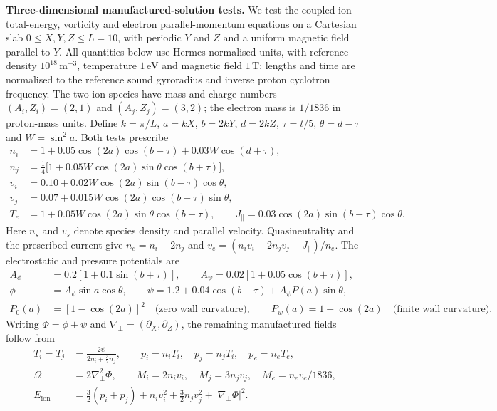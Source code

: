 \documentclass[11pt,a4paper]{article}
\begin{document}
\textbf{Three-dimensional manufactured-solution tests.}
We test the coupled ion total-energy, vorticity and electron parallel-momentum
equations on a Cartesian slab $0\leq X,Y,Z\leq L=10$, with periodic $Y$ and $Z$
and a uniform magnetic field parallel to $Y$.
All quantities below use Hermes normalised units, with reference density
$10^{18}\,\mathrm{m}^{-3}$, temperature $1\,\mathrm{eV}$ and magnetic field
$1\,\mathrm{T}$; lengths and time are normalised to the reference sound
gyroradius and inverse proton cyclotron frequency.
The two ion species have mass and charge numbers $(A_i,Z_i)=(2,1)$ and
$(A_j,Z_j)=(3,2)$; the electron mass is $1/1836$ in proton-mass units.
Define $k=\pi/L$, $a=kX$, $b=2kY$, $d=2kZ$, $\tau=t/5$,
$\theta=d-\tau$ and $W=\sin^2 a$. Both tests prescribe
\begin{align*}
 n_i &= 1+0.05\cos(2a)\cos(b-\tau)+0.03W\cos(d+\tau),\\
 n_j &= \tfrac14\bigl[1+0.05W\cos(2a)\sin\theta\cos(b+\tau)\bigr],\\
 v_i &= 0.10+0.02W\cos(2a)\sin(b-\tau)\cos\theta,\\
 v_j &= 0.07+0.015W\cos(2a)\cos(b+\tau)\sin\theta,\\
 T_e &= 1+0.05W\cos(2a)\sin\theta\cos(b-\tau),
 \qquad J_\parallel=0.03\cos(2a)\sin(b-\tau)\cos\theta.
\end{align*}
Here $n_s$ and $v_s$ denote species density and parallel velocity. Quasineutrality
and the prescribed current give $n_e=n_i+2n_j$ and
$v_e=(n_iv_i+2n_jv_j-J_\parallel)/n_e$.
The electrostatic and pressure potentials are
\begin{align*}
 A_\phi&=0.2[1+0.1\sin(b+\tau)],\qquad
 A_\psi=0.02[1+0.05\cos(b+\tau)],\\
 \phi&=A_\phi\sin a\cos\theta,\qquad
 \psi=1.2+0.04\cos(b-\tau)+A_\psi P(a)\sin\theta,\\
 P_0(a)&=[1-\cos(2a)]^2\quad\text{(zero wall curvature)},\qquad
 P_w(a)=1-\cos(2a)\quad\text{(finite wall curvature)}.
\end{align*}
Writing $\Phi=\phi+\psi$ and $\nabla_\perp=(\partial_X,\partial_Z)$, the remaining
manufactured fields follow from
\begin{align*}
 T_i=T_j&=\frac{2\psi}{2n_i+\tfrac32 n_j},\qquad
 p_i=n_iT_i,\quad p_j=n_jT_i,\quad p_e=n_eT_e,\\
 \Omega&=2\nabla_\perp^2\Phi,\qquad
 M_i=2n_iv_i,\quad M_j=3n_jv_j,\quad M_e=n_ev_e/1836,\\
 E_{\mathrm{ion}}&=\tfrac32(p_i+p_j)+n_iv_i^2+\tfrac32 n_jv_j^2
                  +|\nabla_\perp\Phi|^2.
\end{align*}
\end{document}
